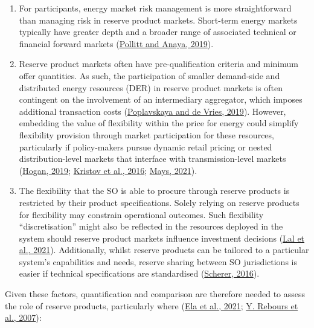 \documentclass[12pt,a4paper,]{report}
\providecommand{\tightlist}{%
  \setlength{\itemsep}{0pt}\setlength{\parskip}{0pt}}
\begin{document}
\begin{enumerate}
\def\labelenumi{\arabic{enumi}.}
\tightlist
\item
  For participants, energy market risk management is more
  straightforward than managing risk in reserve product markets.
  Short-term energy markets typically have greater depth and a broader
  range of associated technical or financial forward markets
  (\protect\hyperlink{ref-pollittCompetitionMarketsAncillary2019}{Pollitt
  and Anaya, 2019}).
\item
  Reserve product markets often have pre-qualification criteria and
  minimum offer quantities. As such, the participation of smaller
  demand-side and distributed energy resources (DER) in reserve product
  markets is often contingent on the involvement of an intermediary
  aggregator, which imposes additional transaction costs
  (\protect\hyperlink{ref-poplavskayaDistributedEnergyResources2019}{Poplavskaya
  and de Vries, 2019}). However, embedding the value of flexibility
  within the price for energy could simplify flexibility provision
  through market participation for these resources, particularly if
  policy-makers pursue dynamic retail pricing or nested
  distribution-level markets that interface with transmission-level
  markets (\protect\hyperlink{ref-hoganMarketDesignPractices2019}{Hogan,
  2019}; \protect\hyperlink{ref-kristovTaleTwoVisions2016}{Kristov et
  al., 2016};
  \protect\hyperlink{ref-maysMissingIncentivesFlexibility2021}{Mays,
  2021}).
\item
  The flexibility that the SO is able to procure through reserve
  products is restricted by their product specifications. Solely relying
  on reserve products for flexibility may constrain operational
  outcomes. Such flexibility ``discretisation'' might also be reflected
  in the resources deployed in the system should reserve product markets
  influence investment decisions
  (\protect\hyperlink{ref-lalEssentialSystemServices2021}{Lal et al.,
  2021}). Additionally, whilst reserve products can be tailored to a
  particular system's capabilities and needs, reserve sharing between SO
  jurisdictions is easier if technical specifications are standardised
  (\protect\hyperlink{ref-schererFrequencyControlEuropean2016}{Scherer,
  2016}).
\end{enumerate}

Given these factors, quantification and comparison are therefore needed
to assess the role of reserve products, particularly where
(\protect\hyperlink{ref-elaElectricityMarketFuture2021}{Ela et al.,
2021}; \protect\hyperlink{ref-reboursFundamentalDesignIssues2007}{Y.
Rebours et al., 2007}):
\end{document}
